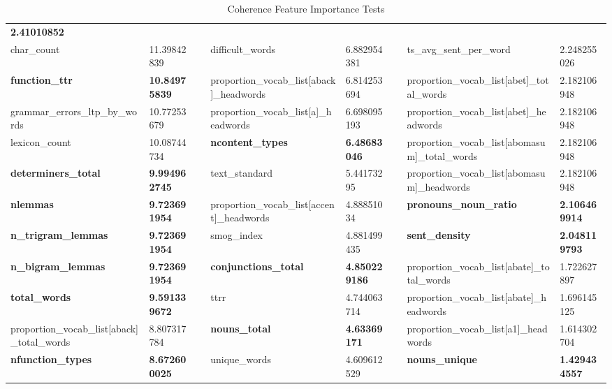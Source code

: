 \begin{table}[h]
{\begin{tabular}{@{}llllllll@{}}
  \cellcolor[HTML]{EFEFEF}\textbf{2.41010852} \\
char\_count &
  11.39842839 &
  &
  difficult\_words &
  6.882954381 &
  &
  ts\_avg\_sent\_per\_word &
  2.248255026 \\
\cellcolor[HTML]{EFEFEF}\textbf{function\_ttr} &
  \cellcolor[HTML]{EFEFEF}\textbf{10.84975839} &
  &
  proportion\_vocab\_list{[}aback{]}\_headwords &
  6.814253694 &
  &
  proportion\_vocab\_list{[}abet{]}\_total\_words &
  2.182106948 \\
grammar\_errors\_ltp\_by\_words &
  10.77253679 &
  &
  proportion\_vocab\_list{[}a{]}\_headwords &
  6.698095193 &
  &
  proportion\_vocab\_list{[}abet{]}\_headwords &
  2.182106948 \\
lexicon\_count &
  10.08744734 &
  &
  \cellcolor[HTML]{EFEFEF}\textbf{ncontent\_types} &
  \cellcolor[HTML]{EFEFEF}\textbf{6.48683046} &
  &
  proportion\_vocab\_list{[}abomasum{]}\_total\_words &
  2.182106948 \\
\cellcolor[HTML]{EFEFEF}\textbf{determiners\_total} &
  \cellcolor[HTML]{EFEFEF}\textbf{9.994962745} &
  &
  text\_standard &
  5.44173295 &
  &
  proportion\_vocab\_list{[}abomasum{]}\_headwords &
  2.182106948 \\
\cellcolor[HTML]{EFEFEF}\textbf{nlemmas} &
  \cellcolor[HTML]{EFEFEF}\textbf{9.723691954} &
  &
  proportion\_vocab\_list{[}accent{]}\_headwords &
  4.88851034 &
  &
  \cellcolor[HTML]{EFEFEF}\textbf{pronouns\_noun\_ratio} &
  \cellcolor[HTML]{EFEFEF}\textbf{2.106469914} \\
\cellcolor[HTML]{EFEFEF}\textbf{n\_trigram\_lemmas} &
  \cellcolor[HTML]{EFEFEF}\textbf{9.723691954} &
  &
  smog\_index &
  4.881499435 &
  &
  \cellcolor[HTML]{EFEFEF}\textbf{sent\_density} &
  \cellcolor[HTML]{EFEFEF}\textbf{2.048119793} \\
\cellcolor[HTML]{EFEFEF}\textbf{n\_bigram\_lemmas} &
  \cellcolor[HTML]{EFEFEF}\textbf{9.723691954} &
  &
  \cellcolor[HTML]{EFEFEF}\textbf{conjunctions\_total} &
  \cellcolor[HTML]{EFEFEF}\textbf{4.850229186} &
  &
  proportion\_vocab\_list{[}abate{]}\_total\_words &
  1.722627897 \\
\cellcolor[HTML]{EFEFEF}\textbf{total\_words} &
  \cellcolor[HTML]{EFEFEF}\textbf{9.591339672} &
  &
  ttrr &
  4.744063714 &
  &
  proportion\_vocab\_list{[}abate{]}\_headwords &
  1.696145125 \\
proportion\_vocab\_list{[}aback{]}\_total\_words &
  8.807317784 &
  &
  \cellcolor[HTML]{EFEFEF}\textbf{nouns\_total} &
  \cellcolor[HTML]{EFEFEF}\textbf{4.63369171} &
  &
  proportion\_vocab\_list{[}a1{]}\_headwords &
  1.614302704 \\
\cellcolor[HTML]{EFEFEF}\textbf{nfunction\_types} &
  \cellcolor[HTML]{EFEFEF}\textbf{8.672600025} &
  &
  unique\_words &
  4.609612529 &
  &
  \cellcolor[HTML]{EFEFEF}\textbf{nouns\_unique} &
  \cellcolor[HTML]{EFEFEF}\textbf{1.429434557} \\ \bottomrule
\end{tabular}%
}
\caption{Coherence Feature Importance Tests}
\label{tab:e4}
\end{table}

